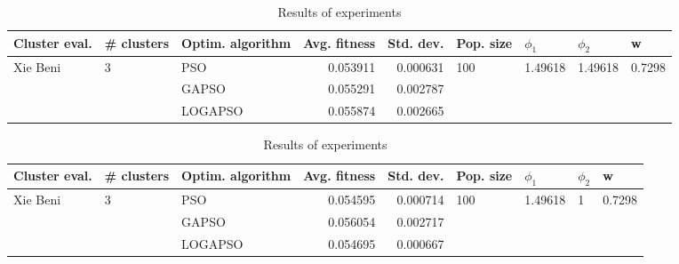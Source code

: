 \documentclass{article}
\begin{document}
\begin{table}
\centering
\caption{Results of experiments}
\begin{tabular}{lllrrllll}
\toprule
            Cluster eval. &        \# clusters & Optim. algorithm &  Avg. fitness &  Std. dev. &            Pop. size &               $\phi_{1}$ &               $\phi_{2}$ &                       w \\
\midrule
\multirow{3}{*}{Xie Beni} & \multirow{3}{*}{3} &              PSO &      0.053911 &   0.000631 & \multirow{3}{*}{100} & \multirow{3}{*}{1.49618} & \multirow{3}{*}{1.49618} & \multirow{3}{*}{0.7298} \\
                          &                    &            GAPSO &      0.055291 &   0.002787 &                      &                          &                          &                         \\
                          &                    &          LOGAPSO &      0.055874 &   0.002665 &                      &                          &                          &                         \\
\bottomrule
\end{tabular}
\end{table}
\begin{table}
\centering
\caption{Results of experiments}
\begin{tabular}{lllrrllll}
\toprule
            Cluster eval. &        \# clusters & Optim. algorithm &  Avg. fitness &  Std. dev. &            Pop. size &               $\phi_{1}$ &         $\phi_{2}$ &                       w \\
\midrule
\multirow{3}{*}{Xie Beni} & \multirow{3}{*}{3} &              PSO &      0.054595 &   0.000714 & \multirow{3}{*}{100} & \multirow{3}{*}{1.49618} & \multirow{3}{*}{1} & \multirow{3}{*}{0.7298} \\
                          &                    &            GAPSO &      0.056054 &   0.002717 &                      &                          &                    &                         \\
                          &                    &          LOGAPSO &      0.054695 &   0.000667 &                      &                          &                    &                         \\
\bottomrule
\end{tabular}
\end{table}
\end{document}
